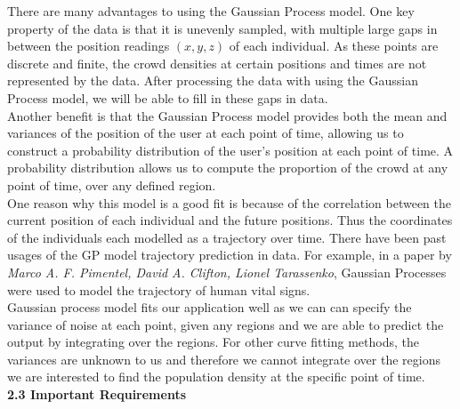 \documentclass[letterpaper]{article}
\begin{document}
There are many advantages to using the Gaussian Process model. One key property of the data is that it is unevenly sampled, with multiple large gaps in between the position readings $(x,y,z)$ of each individual. As these points are discrete and finite, the crowd densities at certain positions and times are not represented by the data. After processing the data with using the Gaussian Process model, we will be able to fill in these gaps in data. \\

Another benefit is that the Gaussian Process model provides both the mean and variances of the position of the user at each point of time, allowing us to construct a probability distribution of the user's position at each point of time. A probability distribution allows us to compute the proportion of the crowd at any point of time, over any defined region. \\

One reason why this model is a good fit is because of the correlation between the current position of each individual and the future positions. Thus the coordinates of the individuals each modelled as a trajectory over time. There have been past usages of the GP model trajectory prediction in data. For example, in a paper by {\it Marco A. F. Pimentel, David A. Clifton, Lionel Tarassenko}, Gaussian Processes were used to model the trajectory of human vital signs. \\


Gaussian process model fits our application well as we can can specify the variance of noise at each point, given any regions and we are able to predict the output by integrating over the regions. For other curve fitting methods, the variances are unknown to us and therefore we cannot integrate over the regions we are interested to find the population density at the specific point of time. \\


{\bf2.3  Important Requirements} \\
\end{document}
